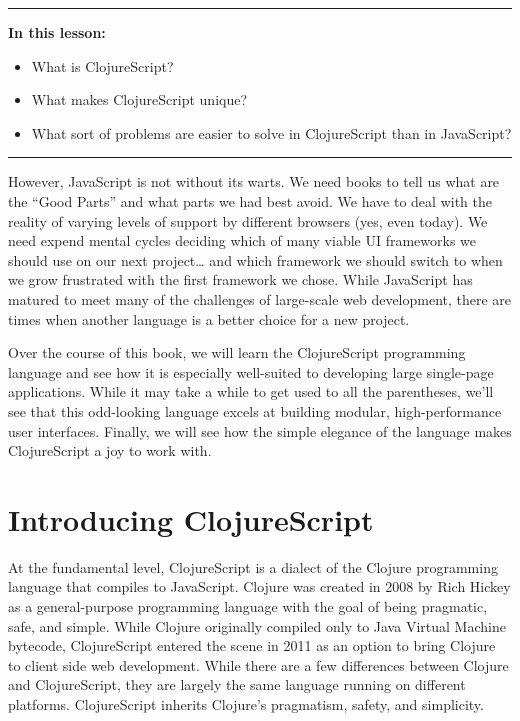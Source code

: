 \documentclass[10pt,twoside,openright]{memoir}
\begin{document}
\begin{center}\rule{0.5\linewidth}{0.5pt}\end{center}

\textbf{In this lesson:}

\begin{itemize}
\tightlist
\item
  What is ClojureScript?
\item
  What makes ClojureScript unique?
\item
  What sort of problems are easier to solve in ClojureScript than in
  JavaScript?
\end{itemize}

\begin{center}\rule{0.5\linewidth}{0.5pt}\end{center}

However, JavaScript is not without its warts. We need books to tell us
what are the ``Good Parts'' and what parts we had best avoid. We have to
deal with the reality of varying levels of support by different browsers
(yes, even today). We need expend mental cycles deciding which of many
viable UI frameworks we should use on our next project\ldots{} and which
framework we should switch to when we grow frustrated with the first
framework we chose. While JavaScript has matured to meet many of the
challenges of large-scale web development, there are times when another
language is a better choice for a new project.

Over the course of this book, we will learn the ClojureScript
programming language and see how it is especially well-suited to
developing large single-page applications. While it may take a while to
get used to all the parentheses, we'll see that this odd-looking
language excels at building modular, high-performance user interfaces.
Finally, we will see how the simple elegance of the language makes
ClojureScript a joy to work with.

\section{Introducing ClojureScript}

At the fundamental level, ClojureScript is a dialect of the Clojure
programming language that compiles to JavaScript. Clojure was created in
2008 by Rich Hickey as a general-purpose programming language with the
goal of being pragmatic, safe, and simple. While Clojure originally
compiled only to Java Virtual Machine  bytecode, ClojureScript entered
the scene in 2011 as an option to bring Clojure to client side web
development. While there are a few differences between Clojure and
ClojureScript, they are largely the same language running on different
platforms. ClojureScript inherits Clojure's pragmatism, safety, and
simplicity.
\end{document}

